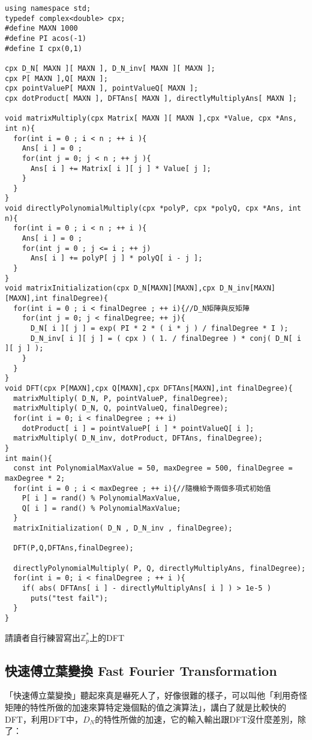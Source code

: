 \begin{lstlisting}
using namespace std;
typedef complex<double> cpx;
#define MAXN 1000
#define PI acos(-1)
#define I cpx(0,1)

cpx D_N[ MAXN ][ MAXN ], D_N_inv[ MAXN ][ MAXN ];
cpx P[ MAXN ],Q[ MAXN ];
cpx pointValueP[ MAXN ], pointValueQ[ MAXN ];
cpx dotProduct[ MAXN ], DFTAns[ MAXN ], directlyMultiplyAns[ MAXN ];

void matrixMultiply(cpx Matrix[ MAXN ][ MAXN ],cpx *Value, cpx *Ans, int n){
  for(int i = 0 ; i < n ; ++ i ){
    Ans[ i ] = 0 ;
    for(int j = 0; j < n ; ++ j ){
      Ans[ i ] += Matrix[ i ][ j ] * Value[ j ];
    }
  }
}
void directlyPolynomialMultiply(cpx *polyP, cpx *polyQ, cpx *Ans, int n){
  for(int i = 0 ; i < n ; ++ i ){
    Ans[ i ] = 0 ;
    for(int j = 0 ; j <= i ; ++ j)
      Ans[ i ] += polyP[ j ] * polyQ[ i - j ];
  }
}
void matrixInitialization(cpx D_N[MAXN][MAXN],cpx D_N_inv[MAXN][MAXN],int finalDegree){
  for(int i = 0 ; i < finalDegree ; ++ i){//D_N矩陣與反矩陣
    for(int j = 0; j < finalDegree; ++ j){
      D_N[ i ][ j ] = exp( PI * 2 * ( i * j ) / finalDegree * I );
      D_N_inv[ i ][ j ] = ( cpx ) ( 1. / finalDegree ) * conj( D_N[ i ][ j ] );
    }
  }
}
void DFT(cpx P[MAXN],cpx Q[MAXN],cpx DFTAns[MAXN],int finalDegree){
  matrixMultiply( D_N, P, pointValueP, finalDegree);
  matrixMultiply( D_N, Q, pointValueQ, finalDegree);
  for(int i = 0; i < finalDegree ; ++ i)
    dotProduct[ i ] = pointValueP[ i ] * pointValueQ[ i ];
  matrixMultiply( D_N_inv, dotProduct, DFTAns, finalDegree);
}
int main(){
  const int PolynomialMaxValue = 50, maxDegree = 500, finalDegree = maxDegree * 2;
  for(int i = 0 ; i < maxDegree ; ++ i){//隨機給予兩個多項式初始值
    P[ i ] = rand() % PolynomialMaxValue,
    Q[ i ] = rand() % PolynomialMaxValue;
  }
  matrixInitialization( D_N , D_N_inv , finalDegree);
  
  DFT(P,Q,DFTAns,finalDegree);
  
  directlyPolynomialMultiply( P, Q, directlyMultiplyAns, finalDegree);
  for(int i = 0; i < finalDegree ; ++ i ){
    if( abs( DFTAns[ i ] - directlyMultiplyAns[ i ] ) > 1e-5 )
      puts("test fail");
  }
}
\end{lstlisting}
請讀者自行練習寫出$\mathbb{Z}_p^*$上的DFT
\subsection{快速傅立葉變換 Fast Fourier Transformation}
\label{sec:comb:gen}
「快速傅立葉變換」聽起來真是嚇死人了，好像很難的樣子，可以叫他「利用奇怪矩陣的特性所做的加速來算特定幾個點的值之演算法」，講白了就是比較快的DFT，利用DFT中，$D_N$的特性所做的加速，它的輸入輸出跟DFT沒什麼差別，除了：


